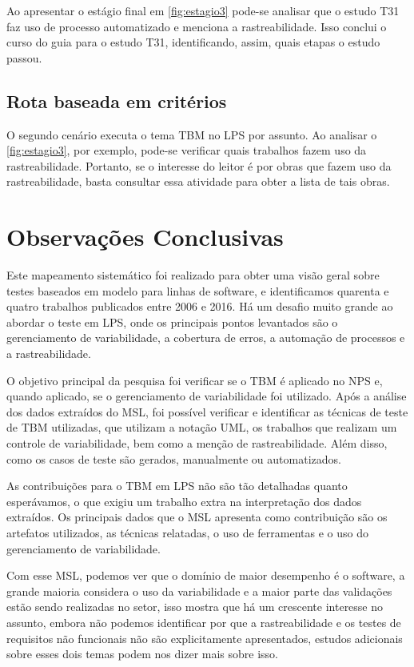 Ao apresentar o estágio final em \ref{fig:estagio3} pode-se analisar que o estudo T31 faz uso de processo automatizado e menciona a rastreabilidade. Isso conclui o curso do guia para o estudo T31, identificando, assim, quais etapas o estudo passou.

\subsection{Rota baseada em critérios}

O segundo cenário executa o tema TBM no LPS por assunto. Ao analisar o \ref{fig:estagio3}, por exemplo, pode-se verificar quais trabalhos fazem uso da rastreabilidade. Portanto, se o interesse do leitor é por obras que fazem uso da rastreabilidade, basta consultar essa atividade para obter a lista de tais obras.


\section{Observações Conclusivas}


Este mapeamento sistemático foi realizado para obter uma visão geral sobre testes baseados em modelo para linhas de software, e identificamos quarenta e quatro trabalhos publicados entre 2006 e 2016.
Há um desafio muito grande ao abordar o teste em LPS, onde os principais pontos levantados são o gerenciamento de variabilidade, a cobertura de erros, a automação de processos e a rastreabilidade.

O objetivo principal da pesquisa foi verificar se o TBM é aplicado no NPS e, quando aplicado, se o gerenciamento de variabilidade foi utilizado.
Após a análise dos dados extraídos do MSL, foi possível verificar e identificar as técnicas de teste de TBM utilizadas, que utilizam a notação UML, os trabalhos que realizam um controle de variabilidade, bem como a menção de rastreabilidade. Além disso, como os casos de teste são gerados, manualmente ou automatizados.

As contribuições para o TBM em LPS não são tão detalhadas quanto esperávamos, o que exigiu um trabalho extra na interpretação dos dados extraídos. Os principais dados que o MSL apresenta como contribuição são os artefatos utilizados, as técnicas relatadas, o uso de ferramentas e o uso do gerenciamento de variabilidade.

Com esse MSL, podemos ver que o domínio de maior desempenho é o software, a grande maioria considera o uso da variabilidade e a maior parte das validações estão sendo realizadas no setor, isso mostra que há um crescente interesse no assunto, embora não podemos identificar por que a rastreabilidade e os testes de requisitos não funcionais não são explicitamente apresentados, estudos adicionais sobre esses dois temas podem nos dizer mais sobre isso.


